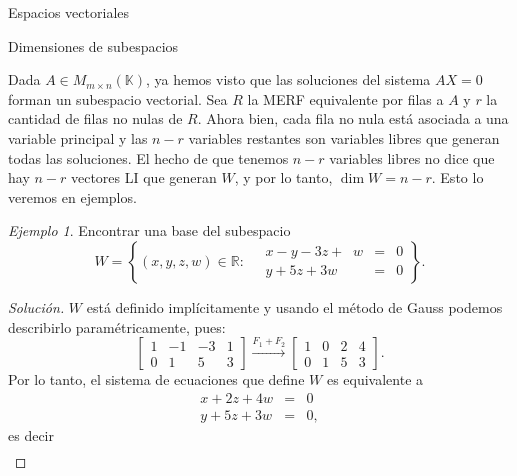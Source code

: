\documentclass[a4paper,12pt,twoside,spanish,reqno]{amsbook}
\numberwithin{equation}{section}
\theoremstyle{definition}
\theoremstyle{remark}
\newtheorem*{ejemplo*}{Ejemplo}
\newcommand{\K}{\mathbb K}
\begin{document}
\begin{chapter}{Espacios vectoriales}
    
    \begin{section}{Dimensiones de subespacios}\label{seccion-dimensiones-de-subespacios}
        
            
        Dada $A \in M_{m\times n}(\K)$,  ya hemos visto que  las soluciones del sistema $AX=0$ forman un subespacio vectorial. Sea $R $ la MERF equivalente por filas a $A$ y $r$ la cantidad de filas no nulas de $R$. Ahora bien, cada fila no nula está asociada  a una  variable principal y las  $n-r$ variables restantes son variables libres  que generan  todas las soluciones.
        El  hecho de que tenemos $n-r$ variables libres no dice que hay $n-r$ vectores LI que generan $W$, y por lo tanto,  $\dim W = n-r$. Esto lo veremos en ejemplos.
        
        \begin{ejemplo*}
            Encontrar una base del subespacio 
            $$
            W = \left\{(x,y,z,w) \in \mathbb{R}: \quad\begin{array}{rcl}
            x-y -3z +\;\;w &=& 0 \\ y +5z +3w &=& 0
            \end{array} \right\}.
            $$
        \end{ejemplo*}
        \begin{proof}[Solución]
            $W$  está definido implícitamente y usando el método de Gauss podemos describirlo paramétricamente, pues:
            \begin{equation*}
            \begin{bmatrix}1&-1&-3&1 \\ 0&1&5&3  \end{bmatrix}
            \stackrel{F_1+F_2}{\longrightarrow} 
            \begin{bmatrix}1&0&2&4 \\ 0&1&5&3  \end{bmatrix}.
            \end{equation*}
            Por lo tanto, el sistema de ecuaciones que define $W$ es equivalente a 
            \begin{equation*}
            \begin{array}{rcl}
            x  +2z +4w &=& 0 \\ y +5z +3w &=& 0,
            \end{array}
            \end{equation*}
            es decir 
            \begin{equation*}
            \begin{array}{rcl}

\end{array}
\end{equation*}
\end{proof}
\end{section}
\end{chapter}
\end{document}

